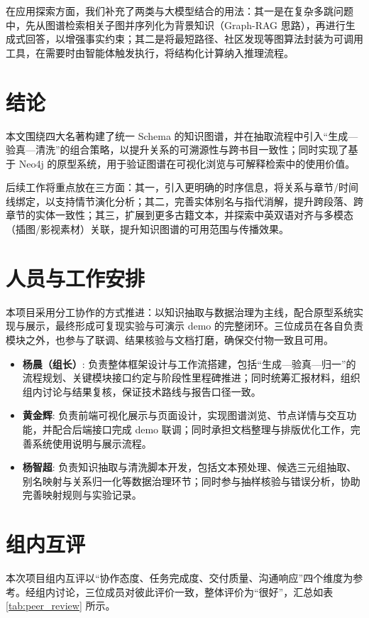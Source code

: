 \documentclass[lang=cn,a4paper,newtx,code=minted]{elegantpaper}
\begin{document}
在应用探索方面，我们补充了两类与大模型结合的用法：其一是在复杂多跳问题中，先从图谱检索相关子图并序列化为背景知识（Graph-RAG 思路），再进行生成式回答，以增强事实约束；其二是将最短路径、社区发现等图算法封装为可调用工具，在需要时由智能体触发执行，将结构化计算纳入推理流程。

\section{结论}

本文围绕四大名著构建了统一 Schema 的知识图谱，并在抽取流程中引入“生成—验真—清洗”的组合策略，以提升关系的可溯源性与跨书目一致性；同时实现了基于 Neo4j 的原型系统，用于验证图谱在可视化浏览与可解释检索中的使用价值。

后续工作将重点放在三方面：其一，引入更明确的时序信息，将关系与章节/时间线绑定，以支持情节演化分析；其二，完善实体别名与指代消解，提升跨段落、跨章节的实体一致性；其三，扩展到更多古籍文本，并探索中英双语对齐与多模态（插图/影视素材）关联，提升知识图谱的可用范围与传播效果。

\section{人员与工作安排}
本项目采用分工协作的方式推进：以知识抽取与数据治理为主线，配合原型系统实现与展示，最终形成可复现实验与可演示 demo 的完整闭环。三位成员在各自负责模块之外，也参与了联调、结果核验与文档打磨，确保交付物一致且可用。
\begin{itemize}
    \item \textbf{杨晨（组长）}: 负责整体框架设计与工作流搭建，包括“生成—验真—归一”的流程规划、关键模块接口约定与阶段性里程碑推进；同时统筹汇报材料，组织组内讨论与结果复核，保证技术路线与报告口径一致。
    \item \textbf{黄金辉}: 负责前端可视化展示与页面设计，实现图谱浏览、节点详情与交互功能，并配合后端接口完成 demo 联调；同时承担文档整理与排版优化工作，完善系统使用说明与展示流程。
    \item \textbf{杨智超}: 负责知识抽取与清洗脚本开发，包括文本预处理、候选三元组抽取、别名映射与关系归一化等数据治理环节；同时参与抽样核验与错误分析，协助完善映射规则与实验记录。
\end{itemize}

\section{组内互评}
\noindent
本次项目组内互评以“协作态度、任务完成度、交付质量、沟通响应”四个维度为参考。经组内讨论，三位成员对彼此评价一致，整体评价为“很好”，汇总如表 \ref{tab:peer_review} 所示。
\end{document}
